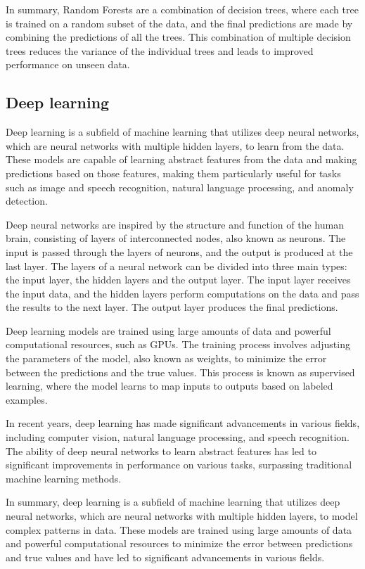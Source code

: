 In summary, Random Forests are a combination of decision trees, where each tree is trained on a random subset of the data, and the final predictions are made by combining the predictions of all the trees. This combination of multiple decision trees reduces the variance of the individual trees and leads to improved performance on unseen data.



\subsection{Deep learning}
Deep learning is a subfield of machine learning that utilizes deep neural networks, which are neural networks with multiple hidden layers, to learn from the data.
These models are capable of learning abstract features from the data and making predictions based on those features, making them particularly useful for tasks such as image and speech recognition, natural language processing, and anomaly detection.

Deep neural networks are inspired by the structure and function of the human brain, consisting of layers of interconnected nodes, also known as neurons.
The input is passed through the layers of neurons, and the output is produced at the last layer.
The layers of a neural network can be divided into three main types: the input layer, the hidden layers and the output layer.
The input layer receives the input data, and the hidden layers perform computations on the data and pass the results to the next layer. 
The output layer produces the final predictions.

Deep learning models are trained using large amounts of data and powerful computational resources, such as GPUs.
The training process involves adjusting the parameters of the model, also known as weights, to minimize the error between the predictions and the true values.
This process is known as supervised learning, where the model learns to map inputs to outputs based on labeled examples.

In recent years, deep learning has made significant advancements in various fields, including computer vision, natural language processing, and speech recognition.
The ability of deep neural networks to learn abstract features has led to significant improvements in performance on various tasks, surpassing traditional machine learning methods.

In summary, deep learning is a subfield of machine learning that utilizes deep neural networks, which are neural networks with multiple hidden layers, to model complex patterns in data.
These models are trained using large amounts of data and powerful computational resources to minimize the error between predictions and true values and have led to significant advancements in various fields.

